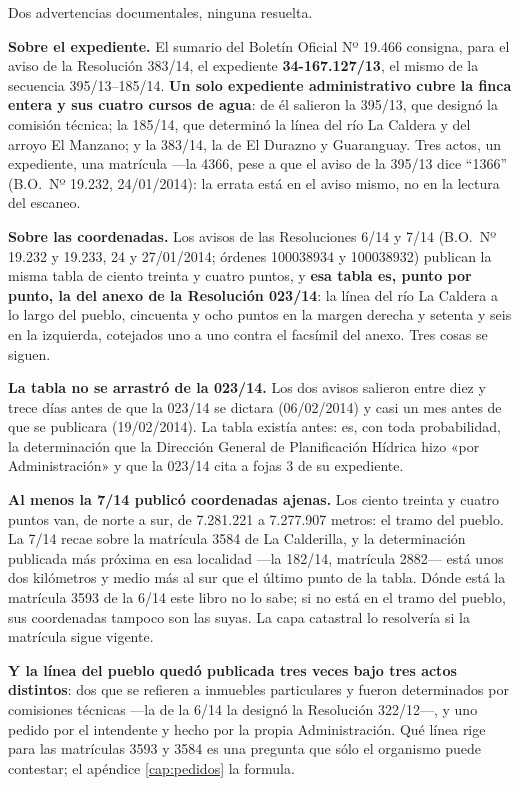 \begin{cautela}
Dos advertencias documentales, ninguna resuelta.

\textbf{Sobre el expediente.} El sumario del Boletín Oficial Nº 19.466 consigna, para el aviso de la Resolución 383/14, el expediente \textbf{34-167.127/13}, el mismo de la secuencia 395/13--185/14. \textbf{Un solo expediente administrativo cubre la finca entera y sus cuatro cursos de agua}: de él salieron la 395/13, que designó la comisión técnica; la 185/14, que determinó la línea del río La Caldera y del arroyo El Manzano; y la 383/14, la de El Durazno y Guaranguay. Tres actos, un expediente, una matrícula ---la 4366, pese a que el aviso de la 395/13 dice ``1366'' (B.O.\ Nº 19.232, 24/01/2014): la errata está en el aviso mismo, no en la lectura del escaneo.

\textbf{Sobre las coordenadas.} Los avisos de las Resoluciones 6/14 y 7/14 (B.O.\ Nº 19.232 y 19.233, 24 y 27/01/2014; órdenes 100038934 y 100038932) publican la misma tabla de ciento treinta y cuatro puntos, y \textbf{esa tabla es, punto por punto, la del anexo de la Resolución 023/14}: la línea del río La Caldera a lo largo del pueblo, cincuenta y ocho puntos en la margen derecha y setenta y seis en la izquierda, cotejados uno a uno contra el facsímil del anexo. Tres cosas se siguen.

\textbf{La tabla no se arrastró de la 023/14.} Los dos avisos salieron entre diez y trece días antes de que la 023/14 se dictara (06/02/2014) y casi un mes antes de que se publicara (19/02/2014). La tabla existía antes: es, con toda probabilidad, la determinación que la Dirección General de Planificación Hídrica hizo «por Administración» y que la 023/14 cita a fojas 3 de su expediente.

\textbf{Al menos la 7/14 publicó coordenadas ajenas.} Los ciento treinta y cuatro puntos van, de norte a sur, de 7.281.221 a 7.277.907 metros: el tramo del pueblo. La 7/14 recae sobre la matrícula 3584 de La Calderilla, y la determinación publicada más próxima en esa localidad ---la 182/14, matrícula 2882--- está unos dos kilómetros y medio más al sur que el último punto de la tabla. Dónde está la matrícula 3593 de la 6/14 este libro no lo sabe; si no está en el tramo del pueblo, sus coordenadas tampoco son las suyas. La capa catastral lo resolvería si la matrícula sigue vigente.

\textbf{Y la línea del pueblo quedó publicada tres veces bajo tres actos distintos}: dos que se refieren a inmuebles particulares y fueron determinados por comisiones técnicas ---la de la 6/14 la designó la Resolución 322/12---, y uno pedido por el intendente y hecho por la propia Administración. Qué línea rige para las matrículas 3593 y 3584 es una pregunta que sólo el organismo puede contestar; el apéndice \ref{cap:pedidos} la formula.
\end{cautela}

